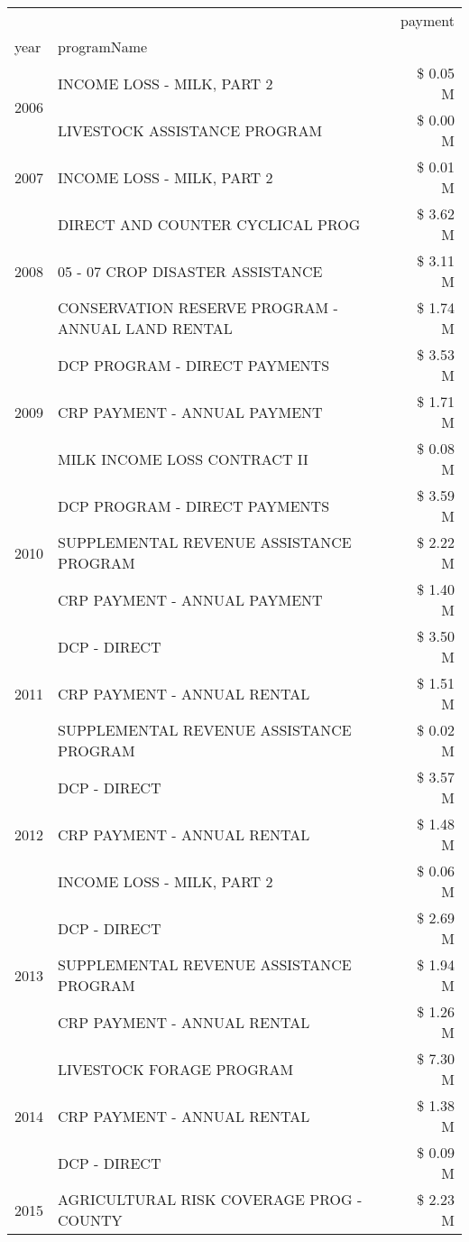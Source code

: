 \begin{tabular}{llr}
\toprule
 &  & payment \\
year & programName &  \\
\midrule
\multirow[t]{2}{*}{2006} & INCOME LOSS - MILK, PART 2 & \$ 0.05 M \\
 & LIVESTOCK ASSISTANCE PROGRAM & \$ 0.00 M \\
\cline{1-3}
2007 & INCOME LOSS - MILK, PART 2 & \$ 0.01 M \\
\cline{1-3}
\multirow[t]{3}{*}{2008} & DIRECT AND COUNTER CYCLICAL PROG & \$ 3.62 M \\
 & 05 - 07 CROP DISASTER ASSISTANCE & \$ 3.11 M \\
 & CONSERVATION RESERVE PROGRAM - ANNUAL LAND RENTAL & \$ 1.74 M \\
\cline{1-3}
\multirow[t]{3}{*}{2009} & DCP PROGRAM - DIRECT PAYMENTS & \$ 3.53 M \\
 & CRP PAYMENT - ANNUAL PAYMENT & \$ 1.71 M \\
 & MILK INCOME LOSS CONTRACT II & \$ 0.08 M \\
\cline{1-3}
\multirow[t]{3}{*}{2010} & DCP PROGRAM - DIRECT PAYMENTS & \$ 3.59 M \\
 & SUPPLEMENTAL REVENUE ASSISTANCE PROGRAM & \$ 2.22 M \\
 & CRP PAYMENT - ANNUAL PAYMENT & \$ 1.40 M \\
\cline{1-3}
\multirow[t]{3}{*}{2011} & DCP - DIRECT & \$ 3.50 M \\
 & CRP PAYMENT - ANNUAL RENTAL & \$ 1.51 M \\
 & SUPPLEMENTAL REVENUE ASSISTANCE PROGRAM & \$ 0.02 M \\
\cline{1-3}
\multirow[t]{3}{*}{2012} & DCP - DIRECT & \$ 3.57 M \\
 & CRP PAYMENT - ANNUAL RENTAL & \$ 1.48 M \\
 & INCOME LOSS - MILK, PART 2 & \$ 0.06 M \\
\cline{1-3}
\multirow[t]{3}{*}{2013} & DCP - DIRECT & \$ 2.69 M \\
 & SUPPLEMENTAL REVENUE ASSISTANCE PROGRAM & \$ 1.94 M \\
 & CRP PAYMENT - ANNUAL RENTAL & \$ 1.26 M \\
\cline{1-3}
\multirow[t]{3}{*}{2014} & LIVESTOCK FORAGE PROGRAM & \$ 7.30 M \\
 & CRP PAYMENT - ANNUAL RENTAL & \$ 1.38 M \\
 & DCP - DIRECT & \$ 0.09 M \\
\cline{1-3}
\multirow[t]{3}{*}{2015} & AGRICULTURAL RISK COVERAGE PROG - COUNTY & \$ 2.23 M \\

\end{tabular}
